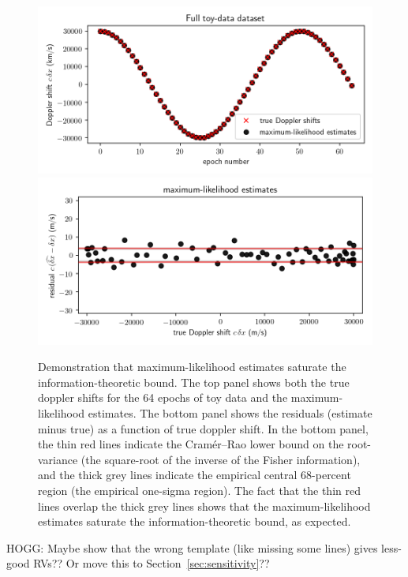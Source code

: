 \documentclass[modern]{aastex631}
\newcommand{\sectionname}{Section}
\newcommand{\secref}[1]{\sectionname~\ref{#1}}
\begin{document}
\begin{figure}[tp]
  \begin{mdframed}
    \begin{center}
    \includegraphics[width=\textwidth]{../notebook/full.png}
    \includegraphics[width=\textwidth]{../notebook/mlrvs.png}
    \end{center}
    \caption{Demonstration that maximum-likelihood estimates saturate the information-theoretic bound.
    The top panel shows both the true doppler shifts for the 64 epochs of toy data and the maximum-likelihood estimates.
    The bottom panel shows the residuals (estimate minus true) as a function of true doppler shift.
    In the bottom panel, the thin red lines indicate the Cram\'er--Rao lower bound on the root-variance (the square-root of the inverse of the Fisher information), and the thick grey lines indicate the empirical central 68-percent region (the empirical one-sigma region).
    The fact that the thin red lines overlap the thick grey lines shows that the maximum-likelihood estimates saturate the information-theoretic bound, as expected.\label{fig:mlrvs}}
  \end{mdframed}
\end{figure}

HOGG: Maybe show that the wrong template (like missing some lines) gives less-good RVs?? Or move this to \secref{sec:sensitivity}??
\end{document}
